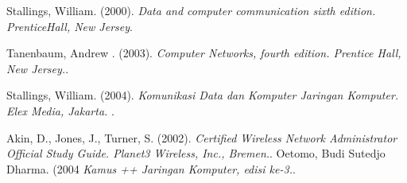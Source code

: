 \documentclass{jtetiproposalskripsi}
\begin{document}

\begin{thebibliography}{9}

Stallings, William. (2000). \emph{Data and computer communication sixth edition. PrenticeHall, New Jersey}.

Tanenbaum, Andrew . (2003). \emph{Computer Networks, fourth edition. Prentice Hall, New Jersey.}.

Stallings, William. (2004). \emph{Komunikasi Data dan Komputer Jaringan Komputer. Elex Media, Jakarta.
}.

Akin, D., Jones, J., Turner, S. (2002). \emph{Certified Wireless Network Administrator Official Study Guide. Planet3 Wireless, Inc., Bremen.}. 
Oetomo, Budi Sutedjo Dharma. (2004 \emph{Kamus ++ Jaringan Komputer, edisi
ke-3.}. 


\end{thebibliography}
\end{document}
